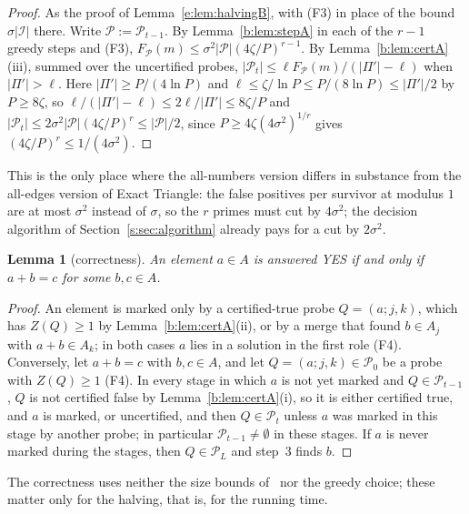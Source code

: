 \documentclass[11pt]{article}
\newtheorem{lemma}[theorem]{Lemma}
\theoremstyle{definition}
\theoremstyle{remark}
\newcommand{\Pq}{\mathcal{P}}
\begin{document}
\begin{proof}
As the proof of Lemma~\ref{e:lem:halvingB}, with (F3) in place of the bound $\sigma|\mathcal I|$ there. Write $\Pq:=\Pq_{t-1}$. By Lemma~\ref{b:lem:stepA} in each of the $r-1$ greedy steps and (F3), $F_{\Pq}(m)\le\sigma^2|\Pq|(4\zeta/P)^{r-1}$. By Lemma~\ref{b:lem:certA}(iii), summed over the uncertified probes, $|\Pq_t|\le\ell F_{\Pq}(m)/(|\Pi'|-\ell)$ when $|\Pi'|>\ell$. Here $|\Pi'|\ge P/(4\ln P)$ and $\ell\le\zeta/\ln P\le P/(8\ln P)\le|\Pi'|/2$ by $P\ge8\zeta$, so $\ell/(|\Pi'|-\ell)\le2\ell/|\Pi'|\le8\zeta/P$ and $|\Pq_t|\le2\sigma^2|\Pq|(4\zeta/P)^r\le|\Pq|/2$, since $P\ge4\zeta(4\sigma^2)^{1/r}$ gives $(4\zeta/P)^r\le1/(4\sigma^2)$.
\end{proof}

This is the only place where the all-numbers version differs in substance from the all-edges version of Exact Triangle: the false positives per survivor at modulus $1$ are at most $\sigma^2$ instead of $\sigma$, so the $r$ primes must cut by $4\sigma^2$; the decision algorithm of Section~\ref{s:sec:algorithm} already pays for a cut by $2\sigma^2$.

\begin{lemma}[correctness]\label{b:lem:corrA}
An element $a\in A$ is answered YES if and only if $a+b=c$ for some $b,c\in A$.
\end{lemma}

\begin{proof}
An element is marked only by a certified-true probe $Q=(a;j,k)$, which has $Z(Q)\ge1$ by Lemma~\ref{b:lem:certA}(ii), or by a merge that found $b\in A_j$ with $a+b\in A_k$; in both cases $a$ lies in a solution in the first role (F4). Conversely, let $a+b=c$ with $b,c\in A$, and let $Q=(a;j,k)\in\Pq_0$ be a probe with $Z(Q)\ge1$ (F4). In every stage in which $a$ is not yet marked and $Q\in\Pq_{t-1}$, $Q$ is not certified false by Lemma~\ref{b:lem:certA}(i), so it is either certified true, and $a$ is marked, or uncertified, and then $Q\in\Pq_t$ unless $a$ was marked in this stage by another probe; in particular $\Pq_{t-1}\ne\emptyset$ in these stages. If $a$ is never marked during the stages, then $Q\in\Pq_L$ and step~3 finds $b$.
\end{proof}

The correctness uses neither the size bounds of~\cite[Lemma~3.3]{FKP24} nor the greedy choice; these matter only for the halving, that is, for the running time.
\end{document}
